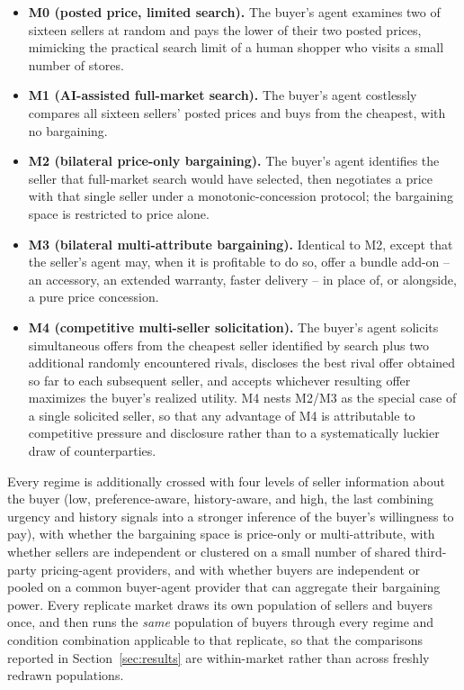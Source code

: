 \documentclass[review]{elsarticle}
\begin{document}
\begin{itemize}
\item \textbf{M0 (posted price, limited search).} The buyer's agent examines two of sixteen sellers at random and pays the lower of their two posted prices, mimicking the practical search limit of a human shopper who visits a small number of stores.
\item \textbf{M1 (AI-assisted full-market search).} The buyer's agent costlessly compares all sixteen sellers' posted prices and buys from the cheapest, with no bargaining.
\item \textbf{M2 (bilateral price-only bargaining).} The buyer's agent identifies the seller that full-market search would have selected, then negotiates a price with that single seller under a monotonic-concession protocol; the bargaining space is restricted to price alone.
\item \textbf{M3 (bilateral multi-attribute bargaining).} Identical to M2, except that the seller's agent may, when it is profitable to do so, offer a bundle add-on -- an accessory, an extended warranty, faster delivery -- in place of, or alongside, a pure price concession.
\item \textbf{M4 (competitive multi-seller solicitation).} The buyer's agent solicits simultaneous offers from the cheapest seller identified by search plus two additional randomly encountered rivals, discloses the best rival offer obtained so far to each subsequent seller, and accepts whichever resulting offer maximizes the buyer's realized utility. M4 nests M2/M3 as the special case of a single solicited seller, so that any advantage of M4 is attributable to competitive pressure and disclosure rather than to a systematically luckier draw of counterparties.
\end{itemize}

Every regime is additionally crossed with four levels of seller information about the buyer (low, preference-aware, history-aware, and high, the last combining urgency and history signals into a stronger inference of the buyer's willingness to pay), with whether the bargaining space is price-only or multi-attribute, with whether sellers are independent or clustered on a small number of shared third-party pricing-agent providers, and with whether buyers are independent or pooled on a common buyer-agent provider that can aggregate their bargaining power. Every replicate market draws its own population of sellers and buyers once, and then runs the \emph{same} population of buyers through every regime and condition combination applicable to that replicate, so that the comparisons reported in Section~\ref{sec:results} are within-market rather than across freshly redrawn populations.
\end{document}

